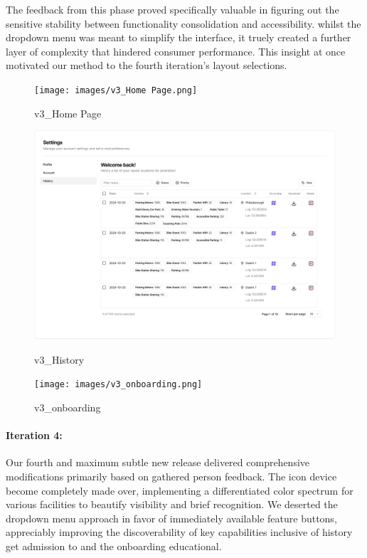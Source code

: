The feedback from this phase proved specifically valuable in figuring out the sensitive stability between functionality consolidation and accessibility. whilst the dropdown menu was meant to simplify the interface, it truely created a further layer of complexity that hindered consumer performance. This insight at once motivated our method to the fourth iteration's layout selections.\begin{figure}[h]
    \centering
    \begin{minipage}{0.32\textwidth}
        \centering
        \texttt{[image: images/v3\_Home Page.png]}
        \caption{v3\_Home Page}
        \label{fig:v3_Home Page}
    \end{minipage}
    \hfill
    \begin{minipage}{0.32\textwidth}
        \centering
        \includegraphics[width=\textwidth]{images/v3_History.png}
        \caption{v3\_History}
        \label{fig:v3_History}
    \end{minipage}
    \hfill
    \begin{minipage}{0.32\textwidth}
        \centering
        \texttt{[image: images/v3\_onboarding.png]}
        \caption{v3\_onboarding}
        \label{fig:v3_onboarding}
    \end{minipage}

\end{figure}



\paragraph{Iteration 4:}
Our fourth and maximum subtle new release delivered comprehensive modifications primarily based on gathered person feedback. The icon device become completely made over, implementing a differentiated color spectrum for various facilities to beautify visibility and brief recognition. We deserted the dropdown menu approach in favor of immediately available feature buttons, appreciably improving the discoverability of key capabilities inclusive of history get admission to and the onboarding educational.

